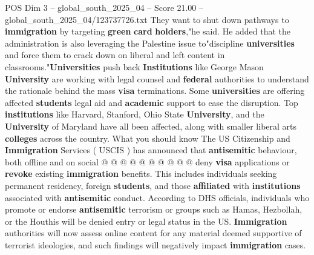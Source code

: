 \begin{textsample}{POS Dim 3 – global\_south\_2025\_04 – Score 21.00 – global\_south\_2025\_04/123737726.txt}
They want to shut down pathways to \textbf{immigration} by targeting \textbf{green} \textbf{card} \textbf{holders},"he said.
He added that the administration is also leveraging the Palestine issue to"discipline \textbf{universities} and force them to crack down on liberal and left content in classrooms."\textbf{Universities} push back \textbf{Institutions} like George Mason \textbf{University} are working with legal counsel and \textbf{federal} authorities to understand the rationale behind the mass \textbf{visa} terminations.
Some \textbf{universities} are offering affected \textbf{students} legal aid and \textbf{academic} support to ease the disruption.
Top \textbf{institutions} like Harvard, Stanford, Ohio State \textbf{University}, and the \textbf{University} of Maryland have all been affected, along with smaller liberal arts \textbf{colleges} across the country.
What you should know The US Citizenship and \textbf{Immigration} Services ( USCIS ) has announced that \textbf{antisemitic} behaviour, both offline and on social @ @ @ @ @ @ @ @ @ @ deny \textbf{visa} applications or \textbf{revoke} existing \textbf{immigration} benefits.
This includes individuals seeking permanent residency, foreign \textbf{students}, and those \textbf{affiliated} with \textbf{institutions} associated with \textbf{antisemitic} conduct.
According to DHS officials, individuals who promote or endorse \textbf{antisemitic} terrorism or groups such as Hamas, Hezbollah, or the Houthis will be denied entry or legal status in the US. \textbf{Immigration} authorities will now assess online content for any material deemed supportive of terrorist ideologies, and such findings will negatively impact \textbf{immigration} cases.

\end{textsample}
